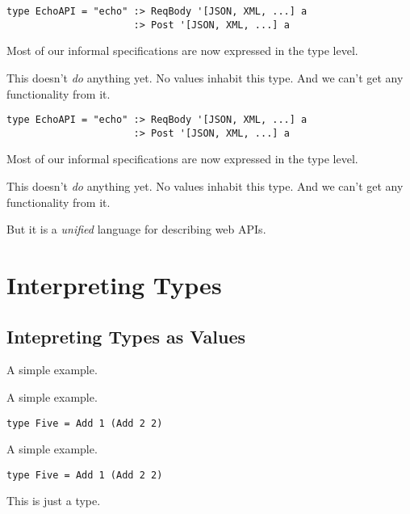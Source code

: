 \documentclass{beamer}
\begin{document}
\begin{frame}[fragile]
\begin{verbatim}
type EchoAPI = "echo" :> ReqBody '[JSON, XML, ...] a
                      :> Post '[JSON, XML, ...] a
\end{verbatim}
Most of our informal specifications are now expressed in the type level.

This doesn't \textit{do} anything yet. No values inhabit this type. And we
can't get any functionality from it.
\end{frame}

\begin{frame}[fragile]
\begin{verbatim}
type EchoAPI = "echo" :> ReqBody '[JSON, XML, ...] a
                      :> Post '[JSON, XML, ...] a
\end{verbatim}
Most of our informal specifications are now expressed in the type level.

This doesn't \textit{do} anything yet. No values inhabit this type. And we
can't get any functionality from it.

But it is a \textit{unified} language for describing web APIs.
\end{frame}

\section{Interpreting Types}%

\subsection{Intepreting Types as Values} %

\begin{frame}
A simple example.
\end{frame}

\begin{frame}[fragile]
A simple example.
\begin{verbatim}
type Five = Add 1 (Add 2 2)
\end{verbatim}
\end{frame}

\begin{frame}[fragile]
A simple example.
\begin{verbatim}
type Five = Add 1 (Add 2 2)
\end{verbatim}
This is just a type.
\end{frame}
\end{document}

